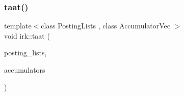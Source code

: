 \mbox{\label{namespaceirk_a936dfbb74aa4684439c364e4b7b62067}} 
\subsubsection{\texorpdfstring{taat()}{taat()}}
{\footnotesize\ttfamily template$<$class Posting\+Lists , class Accumulator\+Vec $>$ \\
void irk\+::taat (\begin{DoxyParamCaption}\item[{const Posting\+Lists \&}]{posting\+\_\+lists,  }\item[{Accumulator\+Vec \&}]{accumulators }\end{DoxyParamCaption})}

